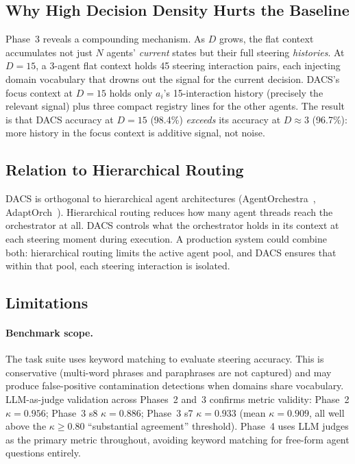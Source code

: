 \documentclass{article}
\begin{document}
\subsection{Why High Decision Density Hurts the Baseline}

Phase~3 reveals a compounding mechanism.
As $D$ grows, the flat context accumulates not just $N$ agents'
\emph{current} states but their full steering \emph{histories}.
At $D=15$, a 3-agent flat context holds 45 steering interaction pairs,
each injecting domain vocabulary that drowns out the signal for the
current decision.
DACS's focus context at $D=15$ holds only $a_i$'s 15-interaction
history (precisely the relevant signal) plus three compact registry
lines for the other agents.
The result is that DACS accuracy at $D=15$ (98.4\%) \emph{exceeds} its
accuracy at $D\approx 3$ (96.7\%): more history in the focus
context is additive signal, not noise.

\subsection{Relation to Hierarchical Routing}

DACS is orthogonal to hierarchical agent architectures
(AgentOrchestra~\citep{agentorchestra2025},
AdaptOrch~\citep{adaptorch2025b}).
Hierarchical routing reduces how many agent threads reach the
orchestrator at all.
DACS controls what the orchestrator holds in its context at each
steering moment during execution.
A production system could combine both: hierarchical routing limits the
active agent pool, and DACS ensures that within that pool, each steering
interaction is isolated.

\subsection{Limitations}

\paragraph{Benchmark scope.}
The task suite uses keyword matching to evaluate steering accuracy.
This is conservative (multi-word phrases and paraphrases are not captured)
and may produce false-positive contamination detections when domains share
vocabulary.
LLM-as-judge validation across Phases~2 and~3 confirms metric validity:
Phase~2 $\kappa=0.956$; Phase~3 s8 $\kappa=0.886$; Phase~3 s7
$\kappa=0.933$ (mean $\kappa=0.909$, all well above the $\kappa{\geq}0.80$
``substantial agreement'' threshold).
Phase~4 uses LLM judges as the primary metric throughout, avoiding
keyword matching for free-form agent questions entirely.
\end{document}
